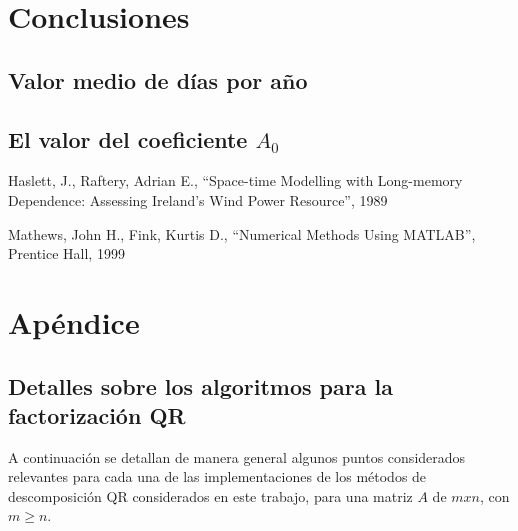 \documentclass[journal, monochrome]{IEEEtran}
\begin{document}
\vspace{1cm}
\section{Conclusiones}
\label{section:conclusions}
\vspace{0.5cm}
\subsection{Valor medio de días por año}



\vspace{0.5cm}
\subsection{El valor del coeficiente $A_{0}$}



\vspace{1cm}
\begin{thebibliography}{1}
	Haslett, J.,
	Raftery, Adrian E.,
	``Space-time Modelling with
   	Long-memory Dependence: Assessing Ireland's Wind Power Resource'',
	1989 

	Mathews, John H.,
	Fink, Kurtis D.,
	``Numerical Methods Using MATLAB'',
	Prentice Hall,
	1999
	
\end{thebibliography}



\clearpage
\section{Apéndice}
\vspace{0.5cm}
\subsection{Detalles sobre los algoritmos para la factorización QR}
\par
A continuación se detallan de manera general algunos puntos considerados relevantes para cada una de las implementaciones de los métodos de descomposición QR considerados en este trabajo, para una matriz $A$ de $mxn$, con $m \geq n$.
\end{document}
